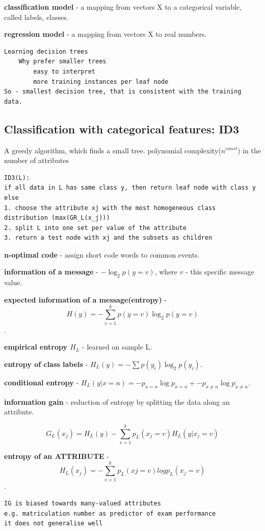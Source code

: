 \documentclass{article}
\newcommand{\para}[0]{\par\vspace{0.2cm}\noindent}
\newcommand{\define}[2]{\textbf{#1} - {#2}.  \para}
\begin{document}
\define{classification model}
           {a mapping from vectors X to a categorical variable, called labels, classes}
\define{regression model}
           {a mapping from vectors X to real numbers}

\begin{verbatim}
Learning decision trees
    Why prefer smaller trees
        easy to interpret
        more training instances per leaf node
So - smallest decision tree, that is consistent with the training data.
\end{verbatim}


\subsection{Classification with categorical features: ID3}
A greedy algorithm, which finds a small tree.
polynomial complexity($n^{const}$) in the number of attributes
\begin{verbatim}
ID3(L):
if all data in L has same class y, then return leaf node with class y else
1. choose the attribute xj with the most homogeneous class distribution (max(GR_L(x_j))) 
2. split L into one set per value of the attribute
3. return a test node with xj and the subsets as children
\end{verbatim}

\define{n-optimal code}
           {assign short code words to common events}

\define{information of a message}
           {$-\log_2 p(y=v)$, where $v$ - this specific message value}

\define{expected information of a message(entropy)}
           {$$ H(y) = -\sum_{v=1}^k p(y=v) \log_2 p(y=v) $$}

\define{empirical entropy $H_L$}
           {learned on sample L}

\define{entropy of class labels}
           {$H_L(y) = - \sum p(y_i) \log_2 p(y_i)$}

\define{conditional entropy}
           {$H_L(y|x=n) = -p_{x=n} \log p_{x=n} +
                          -p_{x \neq n} \log p_{x \neq n}$}

\define{information gain}
           {reduction of entropy by splitting the data along an attribute}
$$ G_L(x_j) = H_L(y) - \sum_{v=1}^k p_L(x_j=v) H_L(y|x_j=v) $$

\define{entropy of an ATTRIBUTE}
           {$$ H_L(x_j) = - \sum_{v=1}^k p_L(xj=v) logp_L(x_j=v) $$}

\begin{verbatim}
IG is biased towards many-valued attributes 
e.g. matriculation number as predictor of exam performance
it does not generalise well
\end{verbatim}
\end{document}
